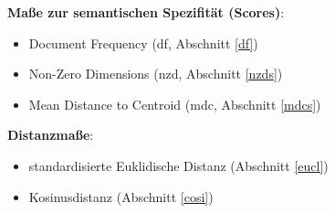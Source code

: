 \documentclass[11pt,numbers=noenddot]{scrartcl}
\begin{document}
\noindent\textbf{Maße zur semantischen Spezifität (Scores)}:
\begin{itemize}
    \item Document Frequency (df, Abschnitt \ref{df})
    \item Non-Zero Dimensions (nzd, Abschnitt \ref{nzds})
    \item Mean Distance to Centroid (mdc, Abschnitt \ref{mdcs})
\end{itemize}

\noindent\textbf{Distanzmaße}:
\begin{itemize}
    \item standardisierte Euklidische Distanz  (Abschnitt \ref{eucl})
    \item Kosinusdistanz (Abschnitt \ref{cosi})
\end{itemize}
\end{document}
